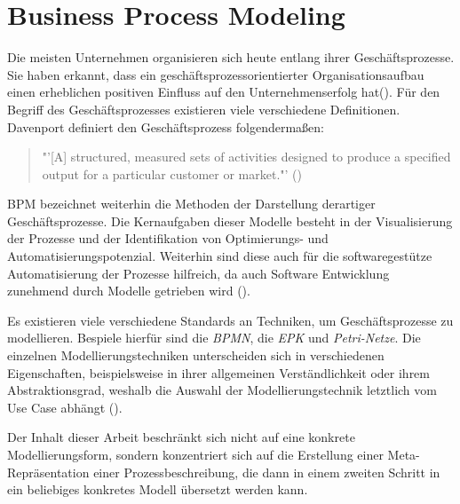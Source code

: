 \section{Business Process Modeling}
Die meisten Unternehmen organisieren sich heute entlang ihrer Geschäftsprozesse. Sie haben erkannt, dass ein geschäftsprozessorientierter Organisationsaufbau einen erheblichen positiven Einfluss auf den Unternehmenserfolg hat(\cite[vgl.][1]{BPM2}). Für den Begriff des Geschäftsprozesses existieren viele verschiedene Definitionen. Davenport definiert den Geschäftsprozess folgendermaßen: 
\begin{quote}
"'[A] structured, measured sets of activities designed to produce a specified output for a particular customer or market."' (\cite[5]{DAVENPORT})
\end{quote} \ac{BPM} bezeichnet weiterhin die Methoden der Darstellung derartiger Geschäftsprozesse. Die Kernaufgaben dieser Modelle besteht in der Visualisierung der Prozesse und der Identifikation von Optimierungs- und Automatisierungspotenzial. Weiterhin sind diese auch für die softwaregestütze Automatisierung der Prozesse hilfreich, da auch Software Entwicklung zunehmend durch Modelle getrieben wird (\cite[vgl.][74]{BPM}).\par
Es existieren viele verschiedene Standards an Techniken, um  Geschäftsprozesse zu modellieren. Bespiele hierfür sind die \textit{\ac{BPMN}}, die \textit{\ac{EPK}} und \textit{Petri-Netze}. Die einzelnen Modellierungstechniken unterscheiden sich in verschiedenen Eigenschaften, beispielsweise in ihrer allgemeinen Verständlichkeit oder ihrem Abstraktionsgrad, weshalb die Auswahl der Modellierungstechnik letztlich vom Use Case abhängt (\cite[vgl.][75]{BPM2}).
\par
Der Inhalt dieser Arbeit beschränkt sich nicht auf eine konkrete Modellierungsform, sondern konzentriert sich auf die Erstellung einer Meta-Repräsentation einer Prozessbeschreibung, die dann in einem zweiten Schritt in ein beliebiges konkretes Modell übersetzt werden kann.